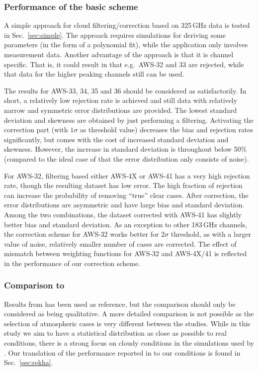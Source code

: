 \documentclass[12pt]{article}
\begin{document}
\subsubsection{Performance of the basic scheme}
%
A simple approach for cloud filtering/correction based on 325\,GHz data is
tested in Sec.~\ref{sec:simple}. The approach requires simulations for deriving
some parameters (in the form of a polynomial fit), while the application only
involves measurement data. Another advantage of the approach is that it is
channel specific. That is, it could result in that e.g.\ AWS-32 and 33 are
rejected, while that data for the higher peaking channels still can be used.

The results for AWS-33, 34, 35 and 36 should be considered as satisfactorily.
In short, a relatively low rejection rate is achieved and still data with
relatively narrow and symmetric error distributions are provided. The lowest
standard deviation and skewness are obtained by just performing a filtering.
Activating the correction part (with $1\sigma$ as threshold value) decreases
the bias and rejection rates significantly, but comes with the cost of
increased standard deviation and skewness. However, the increase in standard
deviation is throughout below 50\% (compared to the ideal case of that the
error distribution only consists of noise). 

For AWS-32, filtering based either AWS-4X or AWS-41 has a very high rejection
rate, though the resulting dataset has low error. The high fraction of
rejection can increase the probability of removing ``true'' clear cases. After
correction, the error distributions are asymmetric and have large bias and
standard deviation. Among the two combinations, the dataset corrected with
AWS-41 has slightly better bias and standard deviation. As an exception to
other 183\,GHz channels, the correction scheme for AWS-32 works better for
$2\sigma$ threshold, as with a larger value of noise, relatively smaller number
of cases are corrected. The effect of mismatch between weighting functions for
AWS-32 and AWS-4X/41 is reflected in the performance of our correction scheme.

\subsubsection{Comparison to \citet{rekha2012potential}}
%
Results from \citet{rekha2012potential} has been used as reference, but the
comparison should only be considered as being qualitative. A more detailed
comparison is not possible as the selection of atmospheric cases is very
different between the studies. While in this study we aim to have a statistical
distribution as close as possible to real conditions, there is a strong focus on
cloudy conditions in the simulations used by \citet{rekha2012potential}. Our
translation of the performance reported in \citet{rekha2012potential} to our
conditions is found in Sec.~\ref{sec:rekha}.
\end{document}
